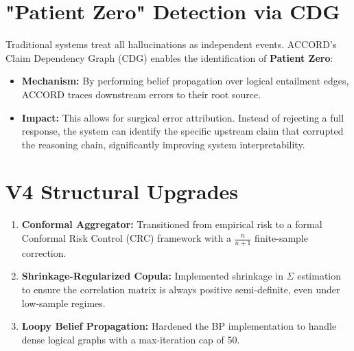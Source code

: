 \documentclass[11pt]{article}
\begin{document}
\section{"Patient Zero" Detection via CDG}
Traditional systems treat all hallucinations as independent events. ACCORD's Claim Dependency Graph (CDG) enables the identification of \textbf{Patient Zero}:
\begin{itemize}
    \item \textbf{Mechanism:} By performing belief propagation over logical entailment edges, ACCORD traces downstream errors to their root source.
    \item \textbf{Impact:} This allows for surgical error attribution. Instead of rejecting a full response, the system can identify the specific upstream claim that corrupted the reasoning chain, significantly improving system interpretability.
\end{itemize}

\section{V4 Structural Upgrades}
\begin{enumerate}
    \item \textbf{Conformal Aggregator:} Transitioned from empirical risk to a formal Conformal Risk Control (CRC) framework with a $\frac{n}{n+1}$ finite-sample correction.
    \item \textbf{Shrinkage-Regularized Copula:} Implemented shrinkage in $\Sigma$ estimation to ensure the correlation matrix is always positive semi-definite, even under low-sample regimes.
    \item \textbf{Loopy Belief Propagation:} Hardened the BP implementation to handle dense logical graphs with a max-iteration cap of 50.
\end{enumerate}
\end{document}

